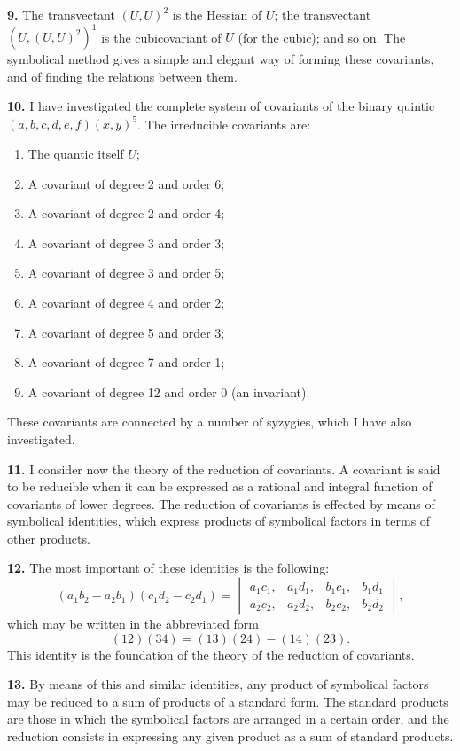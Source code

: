 \documentclass[11pt,a4paper]{book}
\begin{document}
\newpage
\setcounter{page}{250}

\textbf{9.} The transvectant $(U, U)^2$ is the Hessian of $U$; the transvectant $(U, (U, U)^2)^1$ is the cubicovariant of $U$ (for the cubic); and so on. The symbolical method gives a simple and elegant way of forming these covariants, and of finding the relations between them.

\textbf{10.} I have investigated the complete system of covariants of the binary quintic $(a, b, c, d, e, f)(x, y)^5$. The irreducible covariants are:
\begin{enumerate}
\item The quantic itself $U$;
\item A covariant of degree 2 and order 6;
\item A covariant of degree 2 and order 4;
\item A covariant of degree 3 and order 3;
\item A covariant of degree 3 and order 5;
\item A covariant of degree 4 and order 2;
\item A covariant of degree 5 and order 3;
\item A covariant of degree 7 and order 1;
\item A covariant of degree 12 and order 0 (an invariant).
\end{enumerate}
These covariants are connected by a number of syzygies, which I have also investigated.

\newpage
\setcounter{page}{251}

\textbf{11.} I consider now the theory of the reduction of covariants. A covariant is said to be reducible when it can be expressed as a rational and integral function of covariants of lower degrees. The reduction of covariants is effected by means of symbolical identities, which express products of symbolical factors in terms of other products.

\textbf{12.} The most important of these identities is the following:
\[
(a_1 b_2 - a_2 b_1)(c_1 d_2 - c_2 d_1) = \begin{vmatrix}
a_1 c_1, & a_1 d_1, & b_1 c_1, & b_1 d_1 \\
a_2 c_2, & a_2 d_2, & b_2 c_2, & b_2 d_2
\end{vmatrix},
\]
which may be written in the abbreviated form
\[
(12)(34) = (13)(24) - (14)(23).
\]
This identity is the foundation of the theory of the reduction of covariants.

\textbf{13.} By means of this and similar identities, any product of symbolical factors may be reduced to a sum of products of a standard form. The standard products are those in which the symbolical factors are arranged in a certain order, and the reduction consists in expressing any given product as a sum of standard products.
\end{document}
